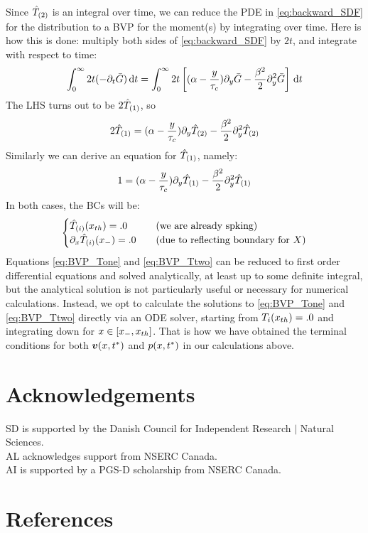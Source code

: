 \documentclass[12pt]{iopart}
\begin{document}
Since ${ \hat{T}_{(2)} }$ is an integral over time, we can reduce the PDE in
\cref{eq:backward_SDF} for the distribution to a BVP for the moment(s) by
integrating over time. Here is how this is done: multiply both sides  of
\cref{eq:backward_SDF} by $2t$, and integrate with respect to time:
\begin{equation}
\int_0^\infty 2t (-{\partial}_t { \bar{G} }) \, \mathrm{d} t
=
\int_0^\infty  2t \left[ ({\alpha} - \frac y{{ \tau_{c} }}) {\partial}_y{ \bar{G} } - \frac {{\beta}^2} 2
{\partial}_y^2 { \bar{G} }\right]
\, \mathrm{d} t
\end{equation}
The LHS turns out to be $2{ \hat{T}_{(1)} }$, so
\begin{equation}
2{ \hat{T}_{(1)} }
=({\alpha} - \frac y{{ \tau_{c} }})   {\partial}_y { \hat{T}_{(2)} }
- \frac {{\beta}^2} 2
{\partial}_y^2 { \hat{T}_{(2)} }
\label{eq:BVP_Ttwo}
\end{equation}
Similarly we can derive an equation for ${ \hat{T}_{(1)} }$, namely:
\begin{equation}
1
=({\alpha} - \frac y{{ \tau_{c} }})   {\partial}_y { \hat{T}_{(1)} }
- \frac {{\beta}^2} 2
{\partial}_y^2 { \hat{T}_{(1)} }
\label{eq:BVP_Tone}
\end{equation}
In both cases, the BCs will be:
\begin{equation}
\begin{cases}
{ \hat{T}_{(i)} }({ x_{th} }) = .0 & \quad (\textrm{we are already spking})
\\
{\partial}_x { \hat{T}_{(i)} }({ x_{-} }) = .0  & \quad (\textrm{due to reflecting boundary for }X)
\end{cases}
\label{eq:BVP_Ti_BCs}
\end{equation}
Equations \ref{eq:BVP_Tone} and \ref{eq:BVP_Ttwo} can be reduced to first order
differential equations and solved analytically, at least up to some definite integral,
but the analytical solution is not particularly useful or necessary for
numerical calculations. Instead, we opt to calculate the solutions to
\ref{eq:BVP_Tone} and \ref{eq:BVP_Ttwo} directly via an ODE solver, starting
from $T_i({ x_{th} }) = .0$ and integrating down for $x  \in [{ x_{-} }, { x_{th} }]$.
That is how we have obtained the terminal conditions for both ${ \boldsymbol{v} }(x,{ t^* })$ and
$p(x,{ t^* })$ in our calculations above.




\section*{Acknowledgements}
SD is supported by the Danish Council for Independent Research $\mid$ 
Natural Sciences.
\\ 
AL acknowledges support from NSERC Canada.  
\\
AI is supported by a PGS-D scholarship from NSERC Canada.

\section*{References}


\end{document}
